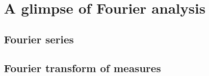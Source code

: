 \chapter{A glimpse of Fourier analysis}
\section{Fourier series}

\section{Fourier transform of measures}